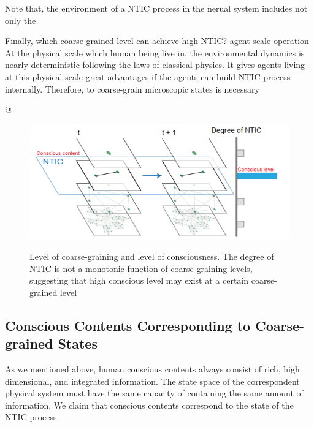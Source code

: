 \documentclass[utf8]{article}
\begin{document}
	    Note that, the environment of a NTIC process in the nerual system includes not only the
        
        Finally, which coarse-grained level can achieve high NTIC? 
        agent-scale operation
        At the physical scale which human being live in, the environmental dynamics is nearly deterministic following the laws of classical physics. It gives agents living at this physical scale great advantages if the agents can build NTIC process internally. Therefore, to coarse-grain microscopic states is necessary
	    
	    
		\begin{ants}
			
			@ 
			
				\begin{figure}[H]				
				\includegraphics[width=\textwidth]{WritingMaterials/Fig_temp/FoxitReader_2019-01-31_19-03-59.png}
				\label{fig:LevelOfConsciousness}
				\caption{Level of coarse-graining and level of consciousness. The degree of NTIC is not a monotonic function of coarse-graining levels, suggesting that high conscious level may exist at a certain coarse-grained level }
				\end{figure}
		\end{ants}

\rlend
{}
		\subsection{Conscious Contents Corresponding to Coarse-grained States}
        As we mentioned above, human conscious contents always consist of rich,  high dimensional, and integrated information. The state space of the correspondent physical system must have the same capacity of containing the same amount of information. We claim that conscious contents correspond to the state of the NTIC process. 
        
\end{document}
